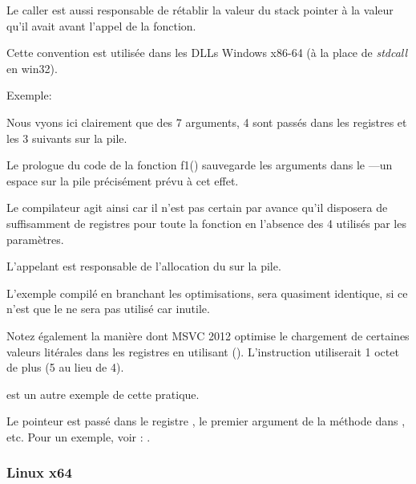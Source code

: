 Le \gls{caller} est aussi responsable de rétablir la valeur du \gls{stack pointer} à la valeur qu'il 
avait avant l'appel de la fonction.

Cette convention est utilisée dans les DLLs Windows x86-64 (à la place de \emph{stdcall} en win32).

Exemple:






Nous vyons ici clairement que des 7 arguments, 4 sont passés dans les registres et les 3 suivants sur 
la pile.

Le prologue du code de la fonction f1() sauvegarde les arguments dans le ---un espace 
sur la pile précisément prévu à cet effet.

Le compilateur agit ainsi car il n'est pas certain par avance qu'il disposera de suffisamment de
registres pour toute la fonction en l'absence des 4 utilisés par les paramètres.

L'appelant est responsable de l'allocation du  sur la pile.



L'exemple compilé en branchant les optimisations, sera quasiment identique, si ce n'est que le 
 ne sera pas utilisé car inutile.

\label{using_MOV_and_pack_of_LEA_to_load_values}

Notez également la manière dont MSVC 2012 optimise le chargement de certaines valeurs litérales dans 
les registres en utilisant \LEA ().
L'instruction  utiliserait 1 octet de plus (5 au lieu de 4).

 est un autre exemple de cette pratique.


Le pointeur \ITthis est passé dans le registre \RCX, le premier argument de la méthode dans \RDX, etc.
Pour un exemple, voir : .
 
\subsubsection{Linux x64}

